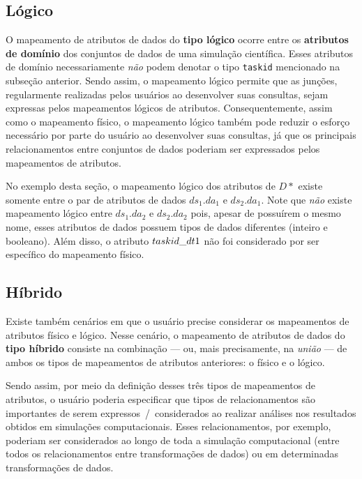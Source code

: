 \subsection{Lógico}

O mapeamento de atributos de dados do \textbf{tipo lógico} ocorre entre os \textbf{atributos de domínio} dos conjuntos de dados de uma simulação científica. Esses atributos de domínio necessariamente \emph{não} podem denotar o tipo \texttt{taskid} mencionado na subseção anterior. Sendo assim, o mapeamento lógico permite que as junções, regularmente realizadas pelos usuários ao desenvolver suas consultas, sejam expressas pelos mapeamentos lógicos de atributos. Consequentemente, assim como o mapeamento físico, o mapeamento lógico também pode reduzir o esforço necessário por parte do usuário ao desenvolver suas consultas, já que os principais relacionamentos entre conjuntos de dados poderiam ser expressados pelos mapeamentos de atributos.

No exemplo desta seção, o mapeamento lógico dos atributos de \(D\ast\) existe somente entre o par de atributos de dados \(ds_1.da_1\) e \(ds_2.da_1\). Note que \emph{não} existe mapeamento lógico entre \(ds_1.da_2\) e \(ds_2.da_2\) pois, apesar de possuírem o mesmo nome, esses atributos de dados possuem tipos de dados diferentes (inteiro e booleano). Além disso, o atributo \(taskid\textup{\_}dt1\) não foi considerado por ser específico do mapeamento físico.

\subsection{Híbrido}

Existe também cenários em que o usuário precise considerar os mapeamentos de atributos físico e lógico. Nesse cenário, o mapeamento de atributos de dados do \textbf{tipo híbrido} consiste na combinação --- ou, mais precisamente, na \emph{união} --- de ambos os tipos de mapeamentos de atributos anteriores: o físico e o lógico. 

Sendo assim, por meio da definição desses três tipos de mapeamentos de atributos, o usuário poderia especificar que tipos de relacionamentos são importantes de serem expressos~/~considerados ao realizar análises nos resultados obtidos em simulações computacionais. Esses relacionamentos, por exemplo, poderiam ser considerados ao longo de toda a simulação computacional (entre todos os relacionamentos entre transformações de dados) ou em determinadas transformações de dados.

